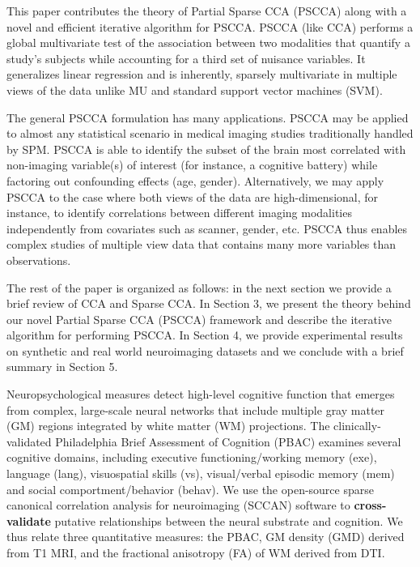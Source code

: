 \documentclass{llncs}
\begin{document}
This paper contributes the theory of Partial Sparse CCA (PSCCA) along
with a novel and efficient iterative algorithm for PSCCA.  PSCCA (like
CCA) performs a global multivariate test of the association between
two modalities that quantify a study's subjects while accounting for a
third set of nuisance variables.  It generalizes linear regression and
is inherently, sparsely multivariate in multiple views of the data
unlike MU and standard support vector machines (SVM).

The general PSCCA formulation has many applications.  PSCCA may be
applied to almost any statistical scenario in medical imaging studies
traditionally handled by SPM.  PSCCA is able to identify the subset of
the brain most correlated with non-imaging variable(s) of interest
(for instance, a cognitive battery) while factoring out confounding
effects (age, gender).  Alternatively, we may apply PSCCA to the case
where both views of the data are high-dimensional, for instance, to
identify correlations between different imaging modalities
independently from covariates such as scanner, gender, etc.  PSCCA
thus enables complex studies of multiple view data that contains many
more variables than observations.

The rest of the paper is organized as follows: in the next section we
provide a brief review of CCA and Sparse CCA. In Section 3, we present
the theory behind our novel Partial Sparse CCA (PSCCA) framework and
describe the iterative algorithm for performing PSCCA. In Section 4,
we provide experimental results on synthetic and real world
neuroimaging datasets and we conclude with a brief summary in Section
5.


Neuropsychological measures detect high-level cognitive function that
emerges from complex, large-scale neural
networks that include multiple gray matter (GM) regions integrated by
white matter (WM) projections. The clinically-validated Philadelphia
Brief Assessment of Cognition (PBAC) \cite{Libon2007} examines several
cognitive domains, including executive functioning/working memory
(exe), language (lang), visuospatial skills (vs), visual/verbal
episodic memory (mem) and social comportment/behavior (behav). We use
the open-source sparse canonical correlation analysis for neuroimaging
(SCCAN) software to {\bf cross-validate} putative relationships
between the neural substrate and cognition.   We thus relate three quantitative measures: the PBAC, GM density (GMD) derived from T1 MRI, and the fractional anisotropy (FA) of WM derived from DTI.
\end{document}
